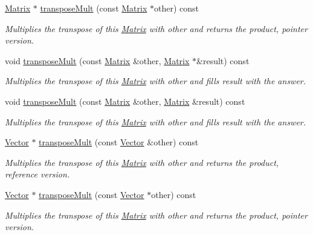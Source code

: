 \begin{DoxyCompactItemize}
\hyperlink{class_c_a_r_o_m_1_1_matrix}{Matrix} $\ast$ \hyperlink{class_c_a_r_o_m_1_1_matrix_ac9f13fd71ea3caced3b42597ada9b7ef}{transpose\-Mult} (const \hyperlink{class_c_a_r_o_m_1_1_matrix}{Matrix} $\ast$other) const 
\begin{DoxyCompactList}\small\item\em Multiplies the transpose of this \hyperlink{class_c_a_r_o_m_1_1_matrix}{Matrix} with other and returns the product, pointer version. \end{DoxyCompactList}\item 
void \hyperlink{class_c_a_r_o_m_1_1_matrix_aef90804ad912c5a779e9bdcb7e995727}{transpose\-Mult} (const \hyperlink{class_c_a_r_o_m_1_1_matrix}{Matrix} \&other, \hyperlink{class_c_a_r_o_m_1_1_matrix}{Matrix} $\ast$\&result) const 
\begin{DoxyCompactList}\small\item\em Multiplies the transpose of this \hyperlink{class_c_a_r_o_m_1_1_matrix}{Matrix} with other and fills result with the answer. \end{DoxyCompactList}\item 
void \hyperlink{class_c_a_r_o_m_1_1_matrix_ae2a0d272c80fbd09370086febf7390d9}{transpose\-Mult} (const \hyperlink{class_c_a_r_o_m_1_1_matrix}{Matrix} \&other, \hyperlink{class_c_a_r_o_m_1_1_matrix}{Matrix} \&result) const 
\begin{DoxyCompactList}\small\item\em Multiplies the transpose of this \hyperlink{class_c_a_r_o_m_1_1_matrix}{Matrix} with other and fills result with the answer. \end{DoxyCompactList}\item 
\hyperlink{class_c_a_r_o_m_1_1_vector}{Vector} $\ast$ \hyperlink{class_c_a_r_o_m_1_1_matrix_a7d1662f706d4eaf8e8b92477ebdb05fa}{transpose\-Mult} (const \hyperlink{class_c_a_r_o_m_1_1_vector}{Vector} \&other) const 
\begin{DoxyCompactList}\small\item\em Multiplies the transpose of this \hyperlink{class_c_a_r_o_m_1_1_matrix}{Matrix} with other and returns the product, reference version. \end{DoxyCompactList}\item 
\hyperlink{class_c_a_r_o_m_1_1_vector}{Vector} $\ast$ \hyperlink{class_c_a_r_o_m_1_1_matrix_a39c61227789aca94eafd288065f13948}{transpose\-Mult} (const \hyperlink{class_c_a_r_o_m_1_1_vector}{Vector} $\ast$other) const 
\begin{DoxyCompactList}\small\item\em Multiplies the transpose of this \hyperlink{class_c_a_r_o_m_1_1_matrix}{Matrix} with other and returns the product, pointer version. \end{DoxyCompactList}\item 

\end{DoxyCompactItemize}

